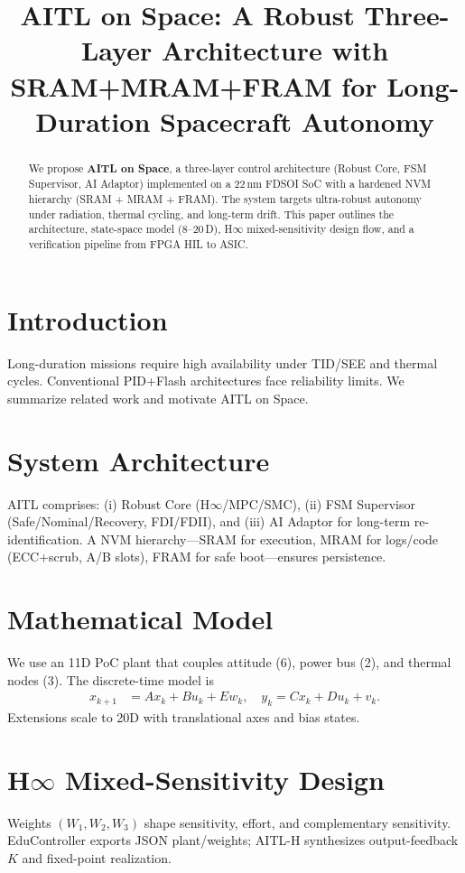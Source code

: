 \documentclass[conference]{IEEEtran}
\title{AITL on Space: A Robust Three-Layer Architecture with SRAM+MRAM+FRAM for Long-Duration Spacecraft Autonomy}
\author{%
  \IEEEauthorblockN{Shinichi Samizo}
  \IEEEauthorblockA{Independent Semiconductor Researcher\\
  Former Engineer at Seiko Epson Corporation\\
  Email: \href{mailto:shin3t72@gmail.com}{shin3t72@gmail.com}\\
  GitHub: \url{https://github.com/Samizo-AITL}}%
}
\begin{document}
\maketitle

\begin{abstract}
We propose \textbf{AITL on Space}, a three-layer control architecture (Robust Core, FSM Supervisor, AI Adaptor) implemented on a 22\,nm FDSOI SoC with a hardened NVM hierarchy (SRAM + MRAM + FRAM). The system targets ultra-robust autonomy under radiation, thermal cycling, and long-term drift. This paper outlines the architecture, state-space model (8--20\,D), H$\infty$ mixed-sensitivity design flow, and a verification pipeline from FPGA HIL to ASIC.
\end{abstract}

\section{Introduction}
Long-duration missions require high availability under TID/SEE and thermal cycles. Conventional PID+Flash architectures face reliability limits. We summarize related work and motivate AITL on Space.

\section{System Architecture}
AITL comprises: (i) Robust Core (H$\infty$/MPC/SMC), (ii) FSM Supervisor (Safe/Nominal/Recovery, FDI/FDII), and (iii) AI Adaptor for long-term re-identification. A NVM hierarchy---SRAM for execution, MRAM for logs/code (ECC+scrub, A/B slots), FRAM for safe boot---ensures persistence.

\section{Mathematical Model}
We use an 11D PoC plant that couples attitude (6), power bus (2), and thermal nodes (3). The discrete-time model is
\begin{align}
x_{k+1} &= A x_k + B u_k + E w_k, \quad
y_k = C x_k + D u_k + v_k.
\end{align}
Extensions scale to 20D with translational axes and bias states.

\section{H$\infty$ Mixed-Sensitivity Design}
Weights $(W_1,W_2,W_3)$ shape sensitivity, effort, and complementary sensitivity. EduController exports JSON plant/weights; AITL-H synthesizes output-feedback $K$ and fixed-point realization.
\end{document}

